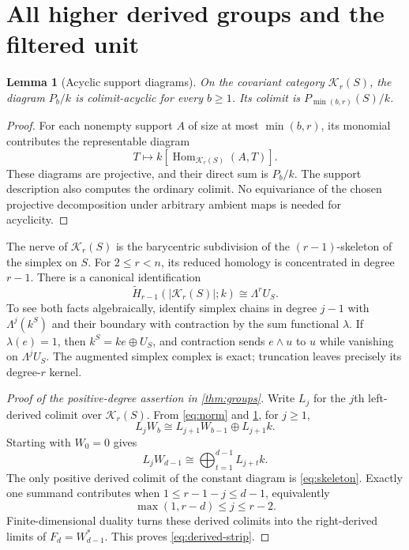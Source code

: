 \documentclass[11pt,a4paper]{article}
\newtheorem{lemma}[theorem]{Lemma}
\theoremstyle{definition}
\theoremstyle{remark}
\newcommand{\Kpos}{\mathcal K_r(S)}
\begin{document}
\section{All higher derived groups and the filtered unit}

\begin{lemma}[Acyclic support diagrams]\label{lem:acyclic}
On the covariant category $\Kpos$, the diagram $P_b/k$ is colimit-acyclic for every $b\ge1$. Its colimit is $P_{\min(b,r)}(S)/k$.
\end{lemma}
\begin{proof}
For each nonempty support $A$ of size at most $\min(b,r)$, its monomial contributes the representable diagram
\[
 T\longmapsto k[\operatorname{Hom}_{\Kpos}(A,T)].
\]
These diagrams are projective, and their direct sum is $P_b/k$. The support description also computes the ordinary colimit. No equivariance of the chosen projective decomposition under arbitrary ambient maps is needed for acyclicity.
\end{proof}

The nerve of $\Kpos$ is the barycentric subdivision of the $(r-1)$-skeleton of the simplex on $S$. For $2\le r<n$, its reduced homology is concentrated in degree $r-1$. There is a canonical identification
\begin{equation}\label{eq:skeleton}
 \widetilde H_{r-1}(|\Kpos|;k)\cong\Lambda^r U_S.
\end{equation}
To see both facts algebraically, identify simplex chains in degree $j-1$ with $\Lambda^j(k^S)$ and their boundary with contraction by the sum functional $\lambda$. If $\lambda(e)=1$, then $k^S=ke\oplus U_S$, and contraction sends $e\wedge u$ to $u$ while vanishing on $\Lambda^jU_S$. The augmented simplex complex is exact; truncation leaves precisely its degree-$r$ kernel.

\begin{proof}[Proof of the positive-degree assertion in \cref{thm:groups}]
Write $L_j$ for the $j$th left-derived colimit over $\Kpos$. From \eqref{eq:norm} and \cref{lem:acyclic}, for $j\ge1$,
\[
 L_jW_b\cong L_{j+1}W_{b-1}\oplus L_{j+1}k.
\]
Starting with $W_0=0$ gives
\begin{equation}\label{eq:shift}
 L_jW_{d-1}\cong\bigoplus_{t=1}^{d-1}L_{j+t}k.
\end{equation}
The only positive derived colimit of the constant diagram is \eqref{eq:skeleton}. Exactly one summand contributes when $1\le r-1-j\le d-1$, equivalently
\[
 \max(1,r-d)\le j\le r-2.
\]
Finite-dimensional duality turns these derived colimits into the right-derived limits of $F_d=W_{d-1}^*$. This proves \eqref{eq:derived-strip}.
\end{proof}
\end{document}
